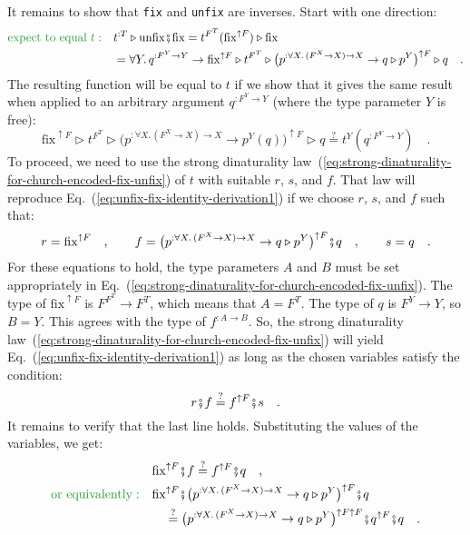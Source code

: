 It remains to show that \lstinline!fix! and \lstinline!unfix! are
inverses. Start with one direction:
\begin{align*}
{\color{greenunder}\text{expect to equal }t:}\quad & t^{:T}\triangleright\text{unfix}\bef\text{fix}=t^{F^{T}}(\text{fix}^{\uparrow F})\triangleright\text{fix}\\
 & =\forall Y.\,q^{:F^{Y}\rightarrow Y}\rightarrow\text{fix}^{\uparrow F}\triangleright t^{F^{T}}\triangleright\big(p^{:\forall X.\,(F^{X}\rightarrow X)\rightarrow X}\rightarrow q\triangleright p^{Y}\big)^{\uparrow F}\triangleright q\quad.
\end{align*}
The resulting function will be equal to $t$ if we show that it gives
the same result when applied to an arbitrary argument $q^{:F^{Y}\rightarrow Y}$
(where the type parameter $Y$ is free):
\begin{equation}
\text{fix}^{\uparrow F}\triangleright t^{F^{T}}\triangleright\big(p^{:\forall X.\,(F^{X}\rightarrow X)\rightarrow X}\rightarrow p^{Y}(q)\big)^{\uparrow F}\triangleright q\overset{?}{=}t^{Y}(q^{:F^{Y}\rightarrow Y})\quad.\label{eq:unfix-fix-identity-derivation1}
\end{equation}
To proceed, we need to use the strong dinaturality law~(\ref{eq:strong-dinaturality-for-church-encoded-fix-unfix})
of $t$ with suitable $r$, $s$, and $f$. That law will reproduce
Eq.~(\ref{eq:unfix-fix-identity-derivation1}) if we choose $r$,
$s$, and $f$ such that:
\[
r=\text{fix}^{\uparrow F}\quad,\quad\quad f=\big(p^{:\forall X.\,(F^{X}\rightarrow X)\rightarrow X}\rightarrow q\triangleright p^{Y}\big)^{\uparrow F}\bef q\quad,\quad\quad s=q\quad.
\]
For these equations to hold, the type parameters $A$ and $B$ must
be set appropriately in Eq.~(\ref{eq:strong-dinaturality-for-church-encoded-fix-unfix}).
The type of $\text{fix}^{\uparrow F}$ is $F^{F^{T}}\rightarrow F^{T}$,
which means that $A=F^{T}$. The type of $q$ is $F^{Y}\rightarrow Y$,
so $B=Y$. This agrees with the type of $f^{:A\rightarrow B}$. So,
the strong dinaturality law~(\ref{eq:strong-dinaturality-for-church-encoded-fix-unfix})
will yield Eq.~(\ref{eq:unfix-fix-identity-derivation1}) as long
as the chosen variables satisfy the condition:
\[
r\bef f\overset{?}{=}f^{\uparrow F}\bef s\quad.
\]
It remains to verify that the last line holds. Substituting the values
of the variables, we get:
\begin{align*}
 & \text{fix}^{\uparrow F}\bef f\overset{?}{=}f^{\uparrow F}\bef q\quad,\\
{\color{greenunder}\text{or equivalently}:}\quad & \text{fix}^{\uparrow F}\bef\big(p^{:\forall X.\,(F^{X}\rightarrow X)\rightarrow X}\rightarrow q\triangleright p^{Y}\big)^{\uparrow F}\bef q\\
 & \quad\overset{?}{=}\big(p^{:\forall X.\,(F^{X}\rightarrow X)\rightarrow X}\rightarrow q\triangleright p^{Y}\big)^{\uparrow F\uparrow F}\bef q^{\uparrow F}\bef q\quad.
\end{align*}
